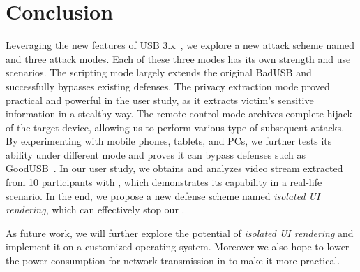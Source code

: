\section{Conclusion}
\label{sec:conclusion}

Leveraging the new features of USB 3.x~\cite{usb31,usb31,usb32}, we explore a
new attack scheme named \tool and three attack modes. Each of these three modes
has its own strength and use scenarios. The scripting mode largely extends the
original BadUSB and successfully bypasses existing defenses. The privacy
extraction mode proved practical and powerful in the user study, as it extracts
victim's sensitive information in a stealthy way. The remote control mode
archives complete hijack of the target device, allowing us to perform various
type of subsequent attacks. By experimenting \tool with mobile phones, tablets,
and PCs, we further tests its ability under different mode and proves it can
bypass defenses such as GoodUSB~\cite{tian2015defending}. In our user study, we
obtains and analyzes video stream extracted from 10 participants with \tool,
which demonstrates its capability in a real-life scenario. In the end, we
propose a new defense scheme named \textit{isolated UI rendering}, which can
effectively stop our \tool.

As future work, we will further explore the potential of \textit{isolated UI
rendering} and implement it on a customized operating system. Moreover we also
hope to lower the power consumption for network transmission in \tool to make
it more practical.
